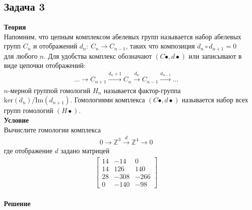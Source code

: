 		\subsection*{\textbf{Задача 3}}
		\textbf{Теория}\\
		Напомним, что цепным комплексом абелевых групп называется набор абелевых групп $C_n$ и отображений $d_n:\ C_n \to C_{n-1}$, таких что композиция $d_n \circ d_{n+1} = 0$ для любого $n$. Для удобства комплекс обозначают $(C\bullet , d\bullet)$ или записывают в виде цепочки отображений:
		\begin{gather*}
			\ldots \rightarrow C_{n+1} \stackrel{d_{n}+1}{\rightarrow} C_{n} \stackrel{d_{n}}{\rightarrow} C_{n-1} \stackrel{d_{n-1}}{\rightarrow} \ldots
		\end{gather*}
		$n$-мерной группой гомологий $H_n$ называется фактор-группа $\text{ker}(d_n)/\text{Im}(d_{n+1})$. Гомологиями комплекса $(C\bullet , d\bullet)$ называется набор всех групп гомологий $(H\bullet )$.
		\\
		\textbf{Условие}\\
		Вычислите гомологии комплекса
		\begin{gather*}
			0 \rightarrow \mathbb{Z}^{3} \stackrel{d}{\rightarrow} \mathbb{Z}^{4} \rightarrow 0
		\end{gather*}
		где отображение $d$ задано матрицей
		\begin{gather*}
			\begin{bmatrix}
				{14} & {-14} & {0} \\
				{14} & {126} & {140} \\
				{28} & {-308} & {-266} \\
				{0} & {-140} & {-98}
			\end{bmatrix}
		\end{gather*}
		\\
		\textbf{Решение}\\
